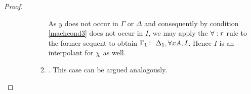 \begin{proof}
\begin{description}
\begin{itemize}
\begin{enumerate}
						As $y$ does not occur in $\Gamma$ or $\Delta$ and consequently by condition \ref{maehcond3} does not occur in $I$, we may apply the $\forall:r$ rule to the former sequent to obtain $\Gamma_1 \vdash \Delta_1, \forall x A, I$.
							Hence $I$ is an interpolant for $\chi$ as well.

						\item {}.
							This case can be argued analogously.
							\qedhere
					\end{enumerate}


			\end{itemize}

			\begin{comment} %
			\item[\normalfont Equality rules.]
				Suppose the property holds for $n$ rule applications and the $(n+1)$th rule is an equality rule.
				We consider an example:

				\begin{itemize}
					\item The last rule application is an instance of $\lkrule{=}{r_1}$. Then it is of the form:
						\begin{prooftree}
							\Axiomm{\Gamma\fCenter \Delta, A\subst{T/t} }
							\Axiomm{\Sigma \fCenter \Pi, s=t}
							\RightLabelm{\lkrule{=}{r_1}}
							\BinaryInfm{\Gamma, \Sigma\fCenter \Delta, \Pi, A\subst{T/s}  }
						\end{prooftree}

						There are two possible partition schemes of $\Gamma, \Sigma \vdash \Delta, \Pi A\subst{T/s} $:
						\begin{enumerate}
							\item $\partisym = \parti{\Gamma_1, \Sigma_1}{\Delta_1, \Pi_1, A\subst{T/s}}{\Gamma_2, \Sigma_2}{\Delta_2, \Pi_2}$.  

								By the induction hypothesis, there is an interpolant $I_1$ for the partition $\parti{\Gamma_1}{\Delta_1, A\subst{T/t}}{\Gamma_2}{\Delta_2}$ of the left upper sequent.
								Hence $\Gamma_1 \fCenter \Delta_1, A\subst{T/t}, I_1$ and $I_1, \Gamma_2 \fCenter \Delta_2$.

								We also get by the induction hypothesis that there is an interpolant $I_2$ for the partition $\parti{\Sigma_1}{\Pi_1, s=t}{\Sigma_2}{\Pi_2}$ of the right upper sequent. Here, we have that 
								$\Sigma_1 \fCenter \Pi_1, s=t, I_2$ and $I_2, \Sigma_2 \fCenter \Pi_2$.


\end{comment}
\end{description}
\end{proof}
